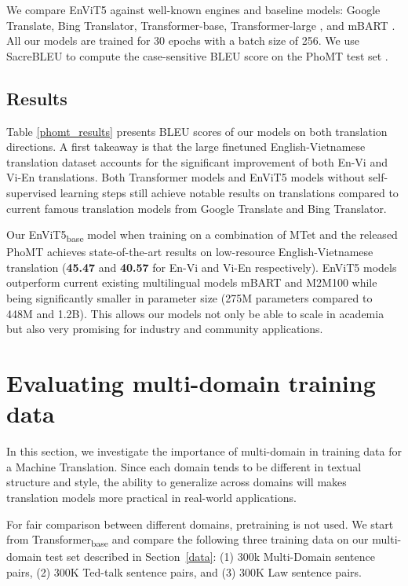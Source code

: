 \documentclass[11pt]{article}
\begin{document}
 We compare EnViT5 against well-known engines and baseline models: Google Translate, Bing Translator, Transformer-base, Transformer-large \cite{vaswani2017attention}, and mBART \cite{phomt}. All our models are trained for 30 epochs with a batch size of 256. We use SacreBLEU \cite{sacrebleu} to compute the case-sensitive BLEU score on the PhoMT test set \cite{phomt}.


\subsection{Results}

Table \ref{phomt_results} presents BLEU scores of our models on both translation directions. A first takeaway is that the large finetuned English-Vietnamese translation dataset accounts for the significant improvement of both En-Vi and Vi-En translations. Both Transformer models \cite{vaswani2017attention} and EnViT5 models \cite{t5} without self-supervised learning steps still achieve notable results on translations compared to current famous translation models from Google Translate and Bing Translator. 



Our EnViT5\textsubscript{base} model when training on a combination of MTet and the released PhoMT achieves state-of-the-art results on low-resource English-Vietnamese translation (\textbf{45.47} and \textbf{40.57} for En-Vi and Vi-En respectively). EnViT5 models outperform current existing multilingual models mBART and M2M100 while being significantly smaller in parameter size (275M parameters compared to 448M and 1.2B). This allows our models not only be able to scale in academia but also very promising for industry and community applications.


 
\section{Evaluating multi-domain training data}
\label{mutidomain}

In this section, we investigate the importance of multi-domain in training data for a Machine Translation. Since each domain tends to be different in textual structure and style, the ability to generalize across domains will makes translation models more practical in real-world applications.

For fair comparison between different domains, pretraining is not used. We start from Transformer\textsubscript{base} \cite{vaswani2017attention} and compare the following three training data on our multi-domain test set described in Section~\ref{data}: (1) 300k Multi-Domain sentence pairs, (2) 300K Ted-talk sentence pairs, and (3) 300K Law sentence pairs.
\end{document}
